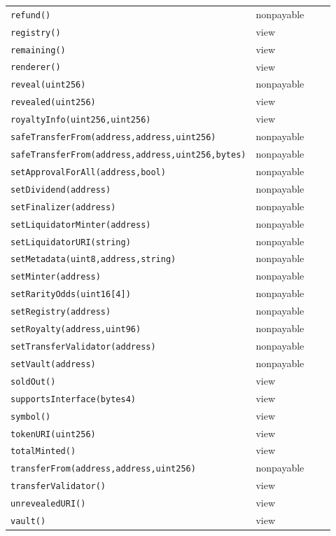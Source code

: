 \begin{longtable}{@{}p{0.62\linewidth}p{0.30\linewidth}@{}}
\texttt{\scriptsize refund()} & nonpayable \\
\texttt{\scriptsize registry()} & view \\
\texttt{\scriptsize remaining()} & view \\
\texttt{\scriptsize renderer()} & view \\
\texttt{\scriptsize reveal(uint256)} & nonpayable \\
\texttt{\scriptsize revealed(uint256)} & view \\
\texttt{\scriptsize royaltyInfo(uint256,uint256)} & view \\
\texttt{\scriptsize safeTransferFrom(address,address,uint256)} & nonpayable \\
\texttt{\scriptsize safeTransferFrom(address,address,uint256,bytes)} & nonpayable \\
\texttt{\scriptsize setApprovalForAll(address,bool)} & nonpayable \\
\texttt{\scriptsize setDividend(address)} & nonpayable \\
\texttt{\scriptsize setFinalizer(address)} & nonpayable \\
\texttt{\scriptsize setLiquidatorMinter(address)} & nonpayable \\
\texttt{\scriptsize setLiquidatorURI(string)} & nonpayable \\
\texttt{\scriptsize setMetadata(uint8,address,string)} & nonpayable \\
\texttt{\scriptsize setMinter(address)} & nonpayable \\
\texttt{\scriptsize setRarityOdds(uint16[4])} & nonpayable \\
\texttt{\scriptsize setRegistry(address)} & nonpayable \\
\texttt{\scriptsize setRoyalty(address,uint96)} & nonpayable \\
\texttt{\scriptsize setTransferValidator(address)} & nonpayable \\
\texttt{\scriptsize setVault(address)} & nonpayable \\
\texttt{\scriptsize soldOut()} & view \\
\texttt{\scriptsize supportsInterface(bytes4)} & view \\
\texttt{\scriptsize symbol()} & view \\
\texttt{\scriptsize tokenURI(uint256)} & view \\
\texttt{\scriptsize totalMinted()} & view \\
\texttt{\scriptsize transferFrom(address,address,uint256)} & nonpayable \\
\texttt{\scriptsize transferValidator()} & view \\
\texttt{\scriptsize unrevealedURI()} & view \\
\texttt{\scriptsize vault()} & view \\
\bottomrule\end{longtable}

